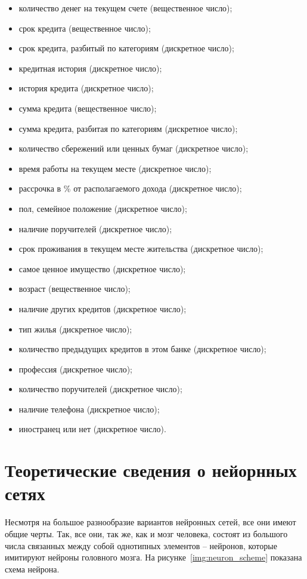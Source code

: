 \begin{itemize}
    \item количество денег на текущем счете (вещественное число);
    \item срок кредита (вещественное число);
    \item срок кредита, разбитый по категориям (дискретное число);
    \item кредитная история (дискретное число);
    \item история кредита (дискретное число);
    \item сумма кредита (вещественное число);
    \item сумма кредита, разбитая по категориям (дискретное число);
    \item количество сбережений или ценных бумаг (дискретное число);
    \item время работы на текущем месте (дискретное число);
    \item рассрочка в \% от располагаемого дохода (дискретное число);
    \item пол, семейное положение (дискретное число);
    \item наличие поручителей (дискретное число);
    \item срок проживания в текущем месте жительства (дискретное число);
    \item самое ценное имущество (дискретное число);
    \item возраст (вещественное число);
    \item наличие других кредитов (дискретное число);
    \item тип жилья (дискретное число);
    \item количество предыдущих кредитов в этом банке (дискретное число);
    \item профессия (дискретное число);
    \item количество поручителей (дискретное число);
    \item наличие телефона (дискретное число);
    \item иностранец или нет (дискретное число).
\end{itemize}

\section{Теоретические сведения о нейорнных сетях}

Несмотря на большое разнообразие вариантов нейронных сетей, все они имеют общие
черты. Так, все они, так же, как и мозг человека, состоят из большого числа
связанных между собой однотипных элементов – нейронов, которые имитируют нейроны
головного мозга. На рисунке~\ref{img:neuron_scheme} показана схема нейрона.

